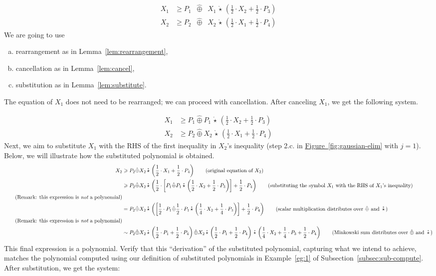 \documentclass[10pt]{amsart}
\theoremstyle{plain}
\theoremstyle{definition}
\providecommand{\namedref}[2]{\hyperref[#2]{#1~\ref*{#2}}\xspace}
\providecommand{\figureref}[1]{\namedref{Figure}{fig:#1}}
\let\geq\geqslant
\providecommand{\cplus}[0]{\ensuremath{\hat{\oplus}}\xspace}
\providecommand{\cmult}[0]{\ensuremath{{\,\mathring{\star}\,}}\xspace}
\begin{document}
    \begin{align*}
        X_1 &\geq P_1 \;\;\cplus\;\; X_1 \cmult \left(\frac12\cdot X_2 + \frac12\cdot P_3\right)\\
        X_2 &\geq P_2 \;\;\cplus\;\; X_2 \cmult \left(\frac12\cdot X_1 + \frac12\cdot P_4\right)
    \end{align*}
We are going to use 
\begin{enumerate}[(a)]
    \item rearrangement as in Lemma~\ref{lem:rearrangement},
    \item cancellation as in Lemma~\ref{lem:cancel},
    \item substitution as in Lemma~\ref{lem:substitute}.
\end{enumerate}
The equation of $X_1$ does not need to be rearranged; we can proceed with cancellation. 
After canceling $X_1$, we get the following system. 

    \begin{align*}
        X_1 &\geq P_1 \cplus P_1 \cmult \left(\frac12\cdot X_2 + \frac12\cdot P_3\right)\\
        X_2 &\geq P_2 \cplus X_2 \cmult \left(\frac12\cdot X_1 + \frac12\cdot P_4\right)
    \end{align*}
Next, we aim to substitute $X_1$ with the RHS of the first inequality in $X_2$'s inequality (step 2.c. in \figureref{gaussian-elim} with $j=1$). 
Below, we will illustrate how the substituted polynomial is obtained. 
\begin{align*}
    X_2 &\geq P_2 \cplus X_2\cmult \left(\frac12\cdot X_1 + \frac12\cdot P_4\right)
                \tag{original equation of $X_2$}\\
    &\geq P_2 \cplus X_2\cmult \left(\frac12\cdot \left[P_1 \cplus P_1 \cmult \left(\frac12\cdot X_2 + \frac12\cdot P_3\right)\right] + \frac12\cdot P_4\right)
                \tag{substituting the symbol $X_1$ with the RHS of $X_1$'s inequality}\\
                \tag{Remark: this expression is {\em not} a polynomial}\\
    &= P_2 \cplus X_2\cmult \left( \left[\frac12\cdot P_1 \cplus \frac12\cdot P_1 \cmult \left(\frac14\cdot X_2 + \frac14\cdot P_3\right)\right] + \frac12\cdot P_4\right)
                \tag{scalar multiplication distributes over $\cplus$ and $\cmult$}\\
                \tag{Remark: this expression is {\em not} a polynomial}\\
    &\sim P_2 \cplus X_2\cmult\left(\frac12\cdot P_1 + \frac12\cdot P_4\right) 
            \cplus X_2\cmult\left(\frac12\cdot P_1+\frac12\cdot P_4\right)\cmult \left(\frac14\cdot X_2 + \frac14\cdot P_3 + \frac12\cdot P_4\right)
                \tag{Minkowski sum distributes over $\cplus$ and $\cmult$}
\end{align*}        
This final expression is a polynomial.
Verify that this ``derivation'' of the substituted polynomial, capturing what we intend to achieve, matches the polynomial computed using our definition of substituted polynomials in Example~\ref{eg:1} of Subsection~\ref{subsec:sub-compute}.
After substitution, we get the system:
\end{document}
